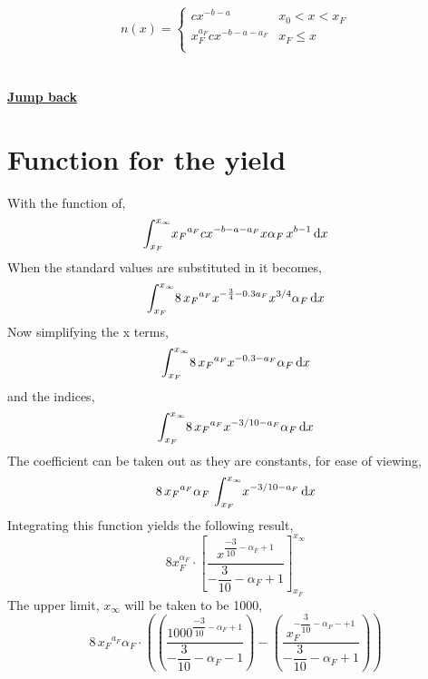 \documentclass{article}
\numberwithin{equation}{section} %
\begin{document}
\begin{equation}
    n(x) =
       \left\{
        \begin{array}{ll}
              cx^{-b-a} & x_0 < x < x_F \\
              x_F^{a_F}cx^{-b-a-a_F} & x_F\leq x \\
        \end{array} 
\right.
\end{equation}
\\
\\
\textbf{\hyperref[jmp:a:abundancepiecewise]{Jump back }}

\newpage
\section{Function for the yield}\label{a:yieldFunction}
With the function of,
\begin{equation}
    \int_{x_{F}}^{x_{\infty }}\!{x_{F}}^{a_{F}}c{x}^{-b-a-a_{F}}x\alpha_{F
}\,{x}^{b-1}\,{\rm d}x
\end{equation}
When the standard values are substituted in it becomes,
\begin{equation}
   \int_{x_{F}}^{x_{\infty }}\!8\,{x_{F}}^{a_{F}}{x}^{- \frac{3}{4}-0.3
a_{F}}{x}^{3/4}\alpha_{F}\,{\rm d}x
\end{equation}
Now simplifying the x terms,
\begin{equation}
    \int_{x_{F}}^{x_{\infty }}\!8\,{x_{F}}^{a_{F}}{x}^{- 0.3-a_{F}}\alpha_
{F}\,{\rm d}x
\end{equation} and the indices,
\begin{equation}
\int_{x_{F}}^{x_{\infty }}\!8\,{x_{F}}^{a_{F}}{x}^{-3/10-a_{F}}\alpha_
{F}\,{\rm d}x
\end{equation}
The coefficient can be taken out as they are constants, for ease of viewing,
\begin{equation}
    8\,{x_{F}}^{a_{F}}\alpha_{F}\,\int_{x_{F}}^{x_{\infty }}\!{x}^{-3/10-a
_{F}}\,{\rm d}x
\end{equation}
Integrating this function yields the following result,
\begin{equation}
    8x_{F}^{\alpha_{F}}\cdot\left[\dfrac{x^{\dfrac{-3}{10}-\alpha_{F}+1}}{-\dfrac{3}{10}-\alpha_{F}+1}\right]_{x_{F}}^{x_{\infty}}
\end{equation}
The upper limit, $ x_{\infty } $ will be taken to be 1000,
\begin{equation}
    8\,{x_{F}}^{a_{F}}\alpha_{F}\cdot\left( \left( \dfrac{1000^{\dfrac{-3}{10}-\alpha_{F}+1}}{-\dfrac{3}{10}-\alpha_{F}-1} \right) - \left( \dfrac{x_{F}^{-\dfrac{3}{10}-\alpha_{F}-+1}}{-\dfrac{3}{10}-\alpha_{F}+1} \right) \right)
\end{equation}
\end{document}
